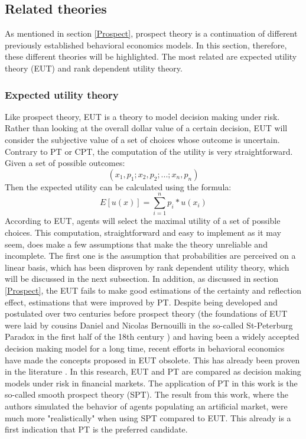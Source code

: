 \subsection{\large{Related theories}}
As mentioned in section \ref{Prospect}, prospect theory is a continuation of different previously established behavioral economics models. In this section, therefore, these different theories will be highlighted. The most related are expected utility theory (EUT) and rank dependent utility theory.
\subsubsection{Expected utility theory} \label{EUT}
Like prospect theory, EUT is a theory to model decision making under risk. Rather than looking at the overall dollar value of a certain decision, EUT will consider the subjective value of a set of choices whose outcome is uncertain. Contrary to PT or CPT, the computation of the utility is very straightforward. Given a set of possible outcomes:
\begin{equation}
    (x_1,p_1;x_2,p_2;...;x_n,p_n)
\end{equation}
Then the expected utility can be calculated using the formula:
\begin{equation}
        E[u(x)] = \sum_{i=1}^{n}    p_i*u(x_i)
\end{equation}
According to EUT, agents will select the maximal utility of a set of possible choices. This computation, straightforward and easy to implement as it may seem, does make a few assumptions that make the theory unreliable and incomplete. The first one is the assumption that probabilities are perceived on a linear basis, which has been disproven by rank dependent utility theory, which will be discussed in the next subsection. In addition, as discussed in section \ref{Prospect}, the EUT fails to make good estimations of the certainty and reflection effect, estimations that were improved by PT. 
\newline \newline 
Despite being developed and postulated over two centuries before prospect theory (the foundations of EUT were laid by cousins Daniel and Nicolas Bernouilli in the so-called St-Peterburg Paradox in the first half of the 18th century \cite{Bernoulli}) and having been a widely accepted decision making model for a long time, recent efforts in behavioral economics have made the concepts proposed in EUT obsolete. This has already been proven in the literature \cite{EUTvsPT}. In this research, EUT and PT are compared as decision making models under risk in financial markets. The application of PT in this work is the so-called smooth prospect theory (SPT). The result from this work, where the authors simulated the behavior of agents populating an artificial market, were much more "realistically"  when using SPT compared to EUT. This already is a first indication that PT is the preferred candidate.
